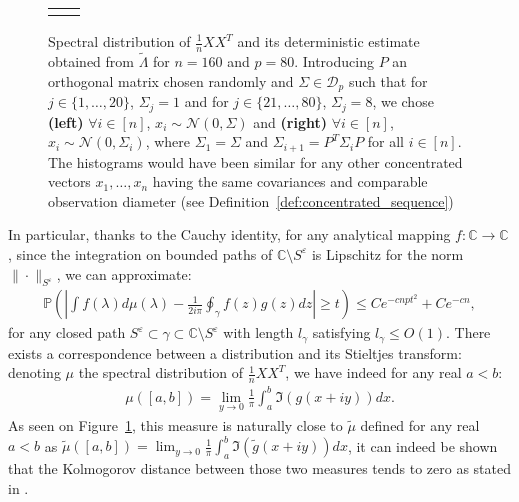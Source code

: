 \documentclass[a4papaer, titlepage]{book}
\begin{document}
\begin{figure}
\begin{tabular}{cc}
\begin{tikzpicture}
\end{tikzpicture}
\end{tabular}
\caption{Spectral distribution of $\frac{1}{n}XX^T$ and its deterministic estimate obtained from $\tilde \Lambda$ for $n=160$ and $p=80$. Introducing $P$ an orthogonal matrix chosen randomly and $\Sigma\in \mathcal D_p$ such that for $j\in\{1,\dots, 20\}$, $\Sigma_j = 1$ and for $j\in\{21,\dots, 80\}$, $\Sigma_j = 8$, we chose \textbf{(left)} $\forall i \in [n]$, $x_i \sim \mathcal N(0, \Sigma)$ and \textbf{(right)} $\forall i \in [n]$, $x_i \sim \mathcal N(0, \Sigma_i)$, where $\Sigma_1 = \Sigma$ and $\Sigma_{i+1} = P^T \Sigma_i P$ for all $i \in[n]$. The histograms would have been similar for any other concentrated vectors $x_1,\ldots, x_n$ having the same covariances and comparable observation diameter (see Definition~\ref{def:concentrated_sequence})}
\label{fig:spectre_XXT_rotation_covariance}
\end{figure}


In particular, thanks to the Cauchy identity, for any analytical mapping $f: \mathbb C \to \mathbb C$, since the integration on bounded paths of $\mathbb C \setminus S^\varepsilon$ is Lipschitz for the norm $\| \cdot \|_{S^\varepsilon}$, we can approximate:
\begin{align*}
  \mathbb P \left( \left\vert \int f(\lambda) d\mu(\lambda) - \frac{1}{2i\pi} \oint_\gamma f(z)g(z) dz\right\vert\geq t\right) \leq C e^{-cnpt^2} + C e^{-cn},
\end{align*}
for any closed path $S^\varepsilon \subset \gamma \subset \mathbb C \setminus S^\varepsilon$ with length $l_\gamma$ satisfying $l_\gamma\leq O(1)$. There exists a correspondence between a distribution and its Stieltjes transform: denoting $\mu$ the spectral distribution of $\frac{1}{n}XX^T$, we have indeed for any real $a<b$:
\begin{align*}
    \mu([a,b]) = \lim_{y \to 0} \frac{1}{\pi } \int_{a}^b \Im(g(x+iy)) dx.
\end{align*}
As seen on Figure~\ref{fig:spectre_XXT_rotation_covariance}, this measure is naturally close to $\tilde \mu$ defined for any real $a<b$ as $\tilde \mu([a,b]) = \lim_{y \to 0} \frac{1}{\pi } \int_{a}^b \Im(\tilde g(x+iy)) dx$, it can indeed be shown that the Kolmogorov distance between those two measures tends to zero as stated in \cite{chouard2022quantitative}.
\end{document}
